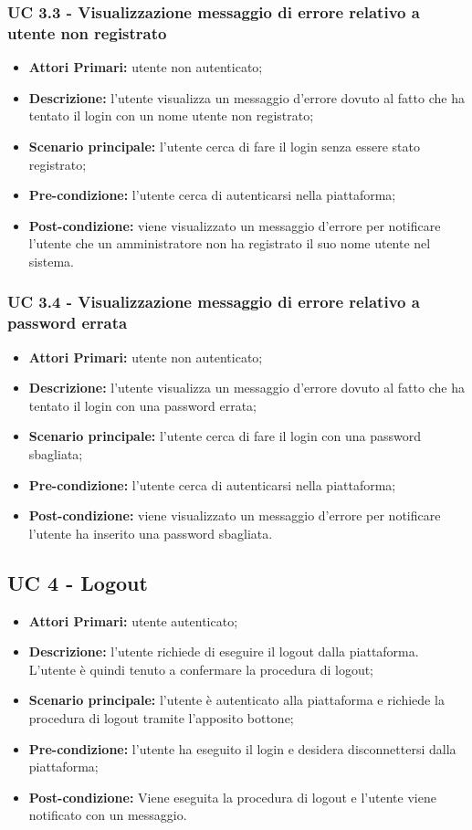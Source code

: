 \subsubsection{UC 3.3 - Visualizzazione messaggio di errore relativo a utente non registrato}
\begin{itemize}
	\item \textbf{Attori Primari:} utente non autenticato;
	\item \textbf{Descrizione:} l'utente visualizza un messaggio d'errore dovuto al fatto che ha tentato il login con un nome utente non registrato;
	\item \textbf{Scenario principale:} l'utente cerca di fare il login senza essere stato registrato;
	\item \textbf{Pre-condizione:} l'utente cerca di autenticarsi nella piattaforma;
	\item \textbf{Post-condizione:} viene visualizzato un messaggio d'errore per notificare l'utente che un amministratore non ha registrato il suo nome utente nel sistema.
\end{itemize}

\subsubsection{UC 3.4 - Visualizzazione messaggio di errore relativo a password errata}
\begin{itemize}
	\item \textbf{Attori Primari:} utente non autenticato;
	\item \textbf{Descrizione:} l'utente visualizza un messaggio d'errore dovuto al fatto che ha tentato il login con una password errata;
	\item \textbf{Scenario principale:} l'utente cerca di fare il login con una password sbagliata;
	\item \textbf{Pre-condizione:} l'utente cerca di autenticarsi nella piattaforma;
	\item \textbf{Post-condizione:} viene visualizzato un messaggio d'errore per notificare l'utente ha inserito una password sbagliata.
\end{itemize}

\subsection{UC 4 - Logout}
\begin{itemize}
	\item \textbf{Attori Primari:} utente autenticato;
	\item \textbf{Descrizione:} l'utente richiede di eseguire il logout dalla piattaforma. L'utente è quindi tenuto a confermare la procedura di logout;
	\item \textbf{Scenario principale:} l'utente è autenticato alla piattaforma e richiede la procedura di logout tramite l'apposito bottone;
	\item \textbf{Pre-condizione:} l'utente ha eseguito il login e desidera disconnettersi dalla piattaforma;
	\item \textbf{Post-condizione:} Viene eseguita la procedura di logout e l'utente viene notificato con un messaggio.
\end{itemize}

